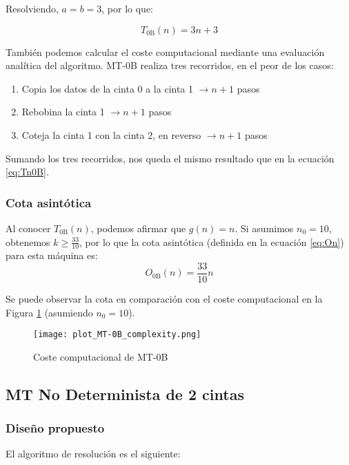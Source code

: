 Resolviendo, $a=b=3$, por lo que:

\begin{equation}
    T_{\mathrm{0B}}(n) = 3n + 3
    \label{eq:Tn0B}
\end{equation}

También podemos calcular el coste computacional mediante una evaluación analítica del algoritmo. MT-0B realiza tres recorridos, en el peor de los casos:
\begin{enumerate}
    \item Copia los datos de la cinta 0 a la cinta 1 $\rightarrow n+1$ pasos
    \item Rebobina la cinta 1 $\rightarrow n+1$ pasos
    \item Coteja la cinta 1 con la cinta 2, en reverso $\rightarrow n+1$ pasos
\end{enumerate}

Sumando los tres recorridos, nos queda el mismo resultado que en la ecuación \ref{eq:Tn0B}.


\subsubsection*{Cota asintótica}
Al conocer $T_{\mathrm{0B}}(n)$, podemos afirmar que $g(n) = n$. Si asumimos $n_0 = 10$, obtenemos $k \geq \frac{33}{10}$, por lo que la cota asintótica (definida en la ecuación \ref{eq:On}) para esta máquina es:
\begin{equation}
    O_{\mathrm{0B}}(n) = \frac{33}{10} n
\end{equation}


Se puede observar la cota en comparación con el coste computacional en la Figura \ref{fig:MT-0B_plot} (asumiendo $n_0 = 10$).

\begin{figure}[h]
    \centering
    \texttt{[image: plot\_MT-0B\_complexity.png]}
    \caption{Coste computacional de MT-0B}
    \label{fig:MT-0B_plot}
\end{figure}



\subsection{MT No Determinista de 2 cintas}

\subsubsection*{Diseño propuesto}
El algoritmo de resolución es el siguiente:

